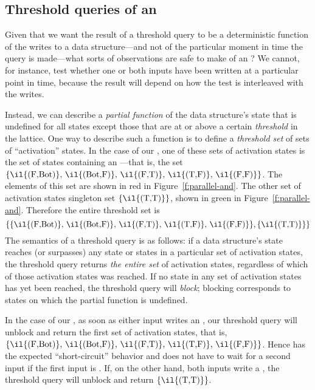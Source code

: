 \subsection{Threshold queries of an }

Given that we want the result of a threshold query to be a deterministic
function of the writes to a data structure---and not of the particular moment in
time the query is made---what sorts of observations are safe to make of an ?
We cannot, for instance, test whether one or both inputs have been
written at a particular point in time, because the result will 
depend on how the test is interleaved with the writes.

Instead, we can describe a \emph{partial function} of the data
structure's state that is undefined for all states except those that
are at or above a certain \emph{threshold} in the lattice.
One way to describe such a function is to define a \emph{threshold
  set} of sets of ``activation'' states.  In the case of our
, one of these sets of activation states is the set of
states containing an ---that is, the set $\{
\textrm{\il{(F,Bot)}, \il{(Bot,F)}, \il{(F,T)}, \il{(T,F)},
  \il{(F,F)}} \}$.  The elements of this set are shown in red in
Figure~\ref{f:parallel-and}.  The other set of activation states
singleton set $\{ \textrm{\il{(T,T)}} \}$, shown in green in
Figure~\ref{f:parallel-and}.  Therefore the entire threshold set is
\[
\{ 
\{ \textrm{\il{(F,Bot)}, \il{(Bot,F)}, \il{(F,T)}, \il{(T,F)}, \il{(F,F)}} \},
\{ \textrm{\il{(T,T)}} \}
\}
\]
The semantics of a threshold query is as follows: if a data structure's state
reaches (or surpasses) any state or states in a particular set of activation
states, the threshold query returns \emph{the entire set} of
activation states, regardless of which of those activation states was reached. If
no state in any set of activation states has yet been reached, the
threshold query will \emph{block}; blocking corresponds to states on
which the partial function is undefined.

In the case of our , as soon as either input writes an
, our threshold query will unblock and return the first set of
activation states, that is, $\{ \textrm{\il{(F,Bot)}, \il{(Bot,F)},
  \il{(F,T)}, \il{(T,F)}, \il{(F,F)}} \}$.  Hence  has the
expected ``short-circuit'' behavior and does not have to wait for a
second input if the first input is .  If, on the other hand, both
inputs write a , the threshold query will unblock and return $\{
\textrm{\il{(T,T)}} \}$.

